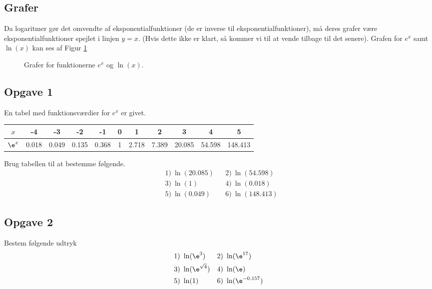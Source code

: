 \subsection*{Grafer}

Da logaritmer gør det omvendte af eksponentialfunktioner (de er inverse til eksponentialfunktioner), må deres grafer være eksponentialfunktioner spejlet i linjen $y = x$. (Hvis dette ikke er klart, så kommer vi til at vende tilbage til det senere). Grafen for $e^x$ samt $\ln(x)$ kan ses af Figur \ref{fig:ekspln}
\begin{figure}[H]
	\centering
	\caption{Grafer for funktionerne $e^x$ og $\ln(x)$.}
	\label{fig:ekspln}
\end{figure}




\subsection*{Opgave 1}
En tabel med funktionsværdier for $e^x$ er givet.
\begin{table}[H]
	\centering
	\begin{tabular}{c|c|c|c|c|c|c|c|c|c|c}
		$x$ & -4 & -3 & -2 & -1 & 0 & 1 & 2 & 3 & 4 & 5 \\
		\hline
		$\e^x$ & 0.018 & 0.049 & 0.135& 0.368 & 1 & 2.718 & 7.389 & 20.085 & 54.598 & 148.413
	\end{tabular}
\end{table}
Brug tabellen til at bestemme følgende.
\begin{align*}
	&1) \ \ln(20.085)     &&2) \ \ln(54.598)    \\
	&3) \ \ln(1)     &&4) \  \ln(0.018)		\\
	&5) \ \ln(0.049) &&6) \ \ln(148.413)    
\end{align*}


\subsection*{Opgave 2}
Bestem følgende udtryk 
\begin{align*}
	&1) \ \ln(\e^3)    &&2) \ \ln(\e^{17})   \\  
	&3) \ \ln(\e^{\sqrt{4}})   &&4) \ \ln(\e)     \\  
	&5) \ \ln(1)   &&6) \ \ln(\e^{-0.157})   \\  
\end{align*}

